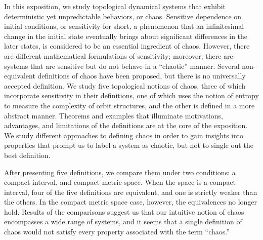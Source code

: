 \documentclass[10pt,twoside,draft]{book}
\begin{document}
In this exposition, we study topological dynamical systems that exhibit deterministic yet unpredictable behaviors, or chaos.
Sensitive dependence on initial conditions, or sensitivity for short, a phenomenon that an infinitesimal change in the initial state eventually brings about significant differences in the later states, is considered to be an essential ingredient of chaos. 
However, there are different mathematical formulations of sensitivity; moreover, there are systems that are sensitive but do not behave in a ``chaotic'' manner.
Several non-equivalent definitions of chaos have been proposed, but there is no universally accepted definition.
We study five topological notions of chaos, three of which incorporate sensitivity in their definitions, one of which uses the notion of entropy to measure the complexity of orbit structures, and the other is defined in a more abstract manner. %
Theorems and examples that illuminate motivations, advantages, and limitations of the definitions are at the core of the exposition.
We study different approaches to defining chaos in order to gain insights into properties that prompt us to label a system as chaotic, but not to single out the best definition.

After presenting five definitions, we compare them under two conditions: a compact interval, and compact metric space.
When the space is a compact interval, four of the five definitions are equivalent, and one is strictly weaker than the others.
In the compact metric space case, however, the equivalences no longer hold.
Results of the comparisons suggest us that our intuitive notion of chaos encompasses a wide range of systems, and it seems that a single definition of chaos would not satisfy every property associated with the term ``chaos.''



\end{document}
